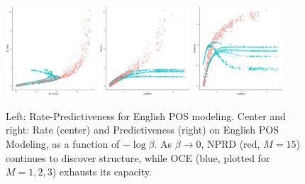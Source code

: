 \documentclass[11pt,letterpaper]{article}
\begin{document}
\begin{figure}
\includegraphics[width=0.3\textwidth]{code/figures/english-info.pdf}
\includegraphics[width=0.3\textwidth]{code/figures/english-nlogbeta-mem.pdf}
\includegraphics[width=0.3\textwidth]{code/figures/english-nlogbeta-ee.pdf}
	\caption{Left: Rate-Predictiveness for English POS modeling. Center and right: Rate (center) and Predictiveness (right) on English POS Modeling, as a function of $-\log \beta$. As $\beta \rightarrow 0$, NPRD (red, $M=15$) continues to discover structure, while OCE (blue, plotted for $M=1,2,3$) exhausts its capacity.}\label{fig:eng-pos}
\end{figure}
\end{document}
